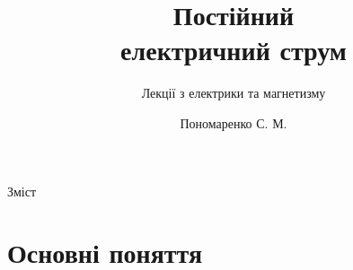 \documentclass[onlytextwidth]{beamer}
\title[Лекції електрики та магнетизму]{\huge\bfseries Постійний\\ електричний струм}
\subtitle{Лекції з електрики та магнетизму}
\author{Пономаренко С. М.}
\date{}
\begin{document}
\begin{frame}[plain]
	\maketitle
\end{frame}

\begin{frame}{Зміст}{}
	\tableofcontents
\end{frame}




\section{Основні поняття}
\end{document}
